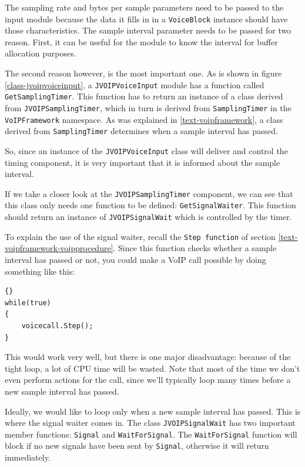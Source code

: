 			The sampling rate and bytes per sample parameters need to be passed to the
			input module because the data it fills in in a {\tt VoiceBlock} instance should
			have those characteristics. The sample interval parameter needs to be passed
			for two reason. First, it can be useful for the module to know the interval for
			buffer allocation purposes.
			
			The second reason however, is the most important one. As is shown in figure
			\ref{class-jvoipvoiceinput}, a {\tt JVOIPVoiceInput} module has a function
			called {\tt GetSamplingTimer}. This function has to return an instance of a
			class derived from {\tt JVOIPSampling\-Timer}, which in turn is derived from
			{\tt SamplingTimer} in the {\tt VoIPFramework} namespace. As was explained
			in \ref{text-voipframework}, a class derived from {\tt SamplingTimer}
			determines when a sample interval has passed.
			
			So, since an instance of the {\tt JVOIPVoiceInput} class will deliver and
			control the timing component, it is very important that it is informed about
			the sample interval.
			
			If we take a closer look at the {\tt JVOIPSamplingTimer} component, we can see
			that this class only needs one function to be defined: {\tt GetSignalWaiter}.
			This function should return an instance of {\tt JVOIPSignalWait} which is
			controlled by the timer.
			
			To explain the use of the signal waiter, recall the {\tt Step function} of
			section \ref{text-voipframework-voipprocedure}. Since this function checks
			whether a sample interval has passed or not, you could make a VoIP call possible
			by doing something like this:
			\begin{lstlisting}[frame=tb]{}
while(true)
{
	voicecall.Step();
}
			\end{lstlisting}
			This would work very well, but there is one major disadvantage: because of the
			tight loop, a lot of CPU time will be wasted. Note that most of the time we
			don't even perform actions for the call, since we'll typically loop many times
			before a new sample interval has passed.
			
			Ideally, we would like to loop only when a new sample interval has passed. This
			is where the signal waiter comes in. The class {\tt JVOIPSignalWait} has two
			important member functions: {\tt Signal} and {\tt WaitForSignal}. The
			{\tt WaitForSignal} function will block if no new signals have been sent by
			{\tt Signal}, otherwise it will return immediately.
			
